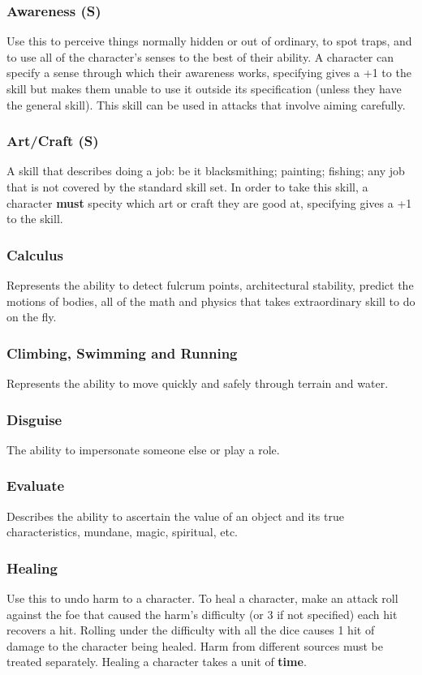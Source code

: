 \subsubsection*{Awareness (S)}
Use this to perceive things normally hidden or out of ordinary, to spot traps, and to use all of the character's senses to the best of their ability. A character can specify a sense through which their awareness works, specifying gives a +1 to the skill but makes them unable to use it outside its specification (unless they have the general skill). This skill can be used in attacks that involve aiming carefully.
\subsubsection*{Art/Craft (S)}
A skill that describes doing a job: be it blacksmithing; painting; fishing; any job that is not covered by the standard skill set. In order to take this skill, a character \textbf{must} specity which art or craft they are good at, specifying gives a +1 to the skill.
\subsubsection*{Calculus}
Represents the ability to detect fulcrum points, architectural stability, predict the motions of bodies, all of the math and physics that takes extraordinary skill to do on the fly.
\subsubsection*{Climbing, Swimming and Running}
Represents the ability to move quickly and safely through terrain and water.
\subsubsection*{Disguise}
The ability to impersonate someone else or play a role.
\subsubsection*{Evaluate}
Describes the ability to ascertain the value of an object and its true characteristics, mundane, magic, spiritual, etc.
\subsubsection*{Healing}
Use this to undo harm to a character. To heal a character, make an attack roll against the foe that caused the harm's difficulty (or 3 if not specified) each hit recovers a hit. Rolling under the difficulty with all the dice causes 1 hit of damage to the character being healed. Harm from different sources must be treated separately. Healing a character takes a unit of \textbf{time}.
